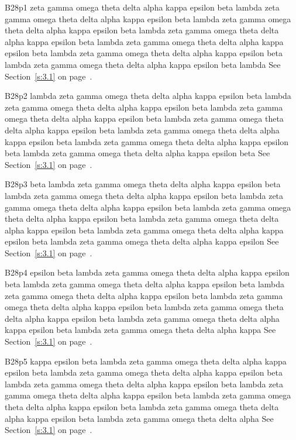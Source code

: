 B28p1 zeta gamma omega theta delta alpha kappa epsilon beta lambda zeta gamma omega theta delta alpha kappa epsilon beta lambda zeta gamma omega theta delta alpha kappa epsilon beta lambda zeta gamma omega theta delta alpha kappa epsilon beta lambda zeta gamma omega theta delta alpha kappa epsilon beta lambda zeta gamma omega theta delta alpha kappa epsilon beta lambda zeta gamma omega theta delta alpha kappa epsilon beta lambda See Section~\ref{s:3.1} on page~\pageref{s:3.1}.

B28p2 lambda zeta gamma omega theta delta alpha kappa epsilon beta lambda zeta gamma omega theta delta alpha kappa epsilon beta lambda zeta gamma omega theta delta alpha kappa epsilon beta lambda zeta gamma omega theta delta alpha kappa epsilon beta lambda zeta gamma omega theta delta alpha kappa epsilon beta lambda zeta gamma omega theta delta alpha kappa epsilon beta lambda zeta gamma omega theta delta alpha kappa epsilon beta See Section~\ref{s:3.1} on page~\pageref{s:3.1}.

B28p3 beta lambda zeta gamma omega theta delta alpha kappa epsilon beta lambda zeta gamma omega theta delta alpha kappa epsilon beta lambda zeta gamma omega theta delta alpha kappa epsilon beta lambda zeta gamma omega theta delta alpha kappa epsilon beta lambda zeta gamma omega theta delta alpha kappa epsilon beta lambda zeta gamma omega theta delta alpha kappa epsilon beta lambda zeta gamma omega theta delta alpha kappa epsilon See Section~\ref{s:3.1} on page~\pageref{s:3.1}.

B28p4 epsilon beta lambda zeta gamma omega theta delta alpha kappa epsilon beta lambda zeta gamma omega theta delta alpha kappa epsilon beta lambda zeta gamma omega theta delta alpha kappa epsilon beta lambda zeta gamma omega theta delta alpha kappa epsilon beta lambda zeta gamma omega theta delta alpha kappa epsilon beta lambda zeta gamma omega theta delta alpha kappa epsilon beta lambda zeta gamma omega theta delta alpha kappa See Section~\ref{s:3.1} on page~\pageref{s:3.1}.

B28p5 kappa epsilon beta lambda zeta gamma omega theta delta alpha kappa epsilon beta lambda zeta gamma omega theta delta alpha kappa epsilon beta lambda zeta gamma omega theta delta alpha kappa epsilon beta lambda zeta gamma omega theta delta alpha kappa epsilon beta lambda zeta gamma omega theta delta alpha kappa epsilon beta lambda zeta gamma omega theta delta alpha kappa epsilon beta lambda zeta gamma omega theta delta alpha See Section~\ref{s:3.1} on page~\pageref{s:3.1}.

